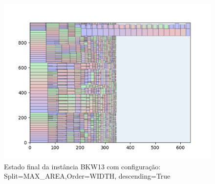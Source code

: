 \begin{figure}[H]
    \centering
    \caption[]{Estado final da instância BKW13 com configuração: Split=MAX_AREA,Order=WIDTH, descending=True}
    \label{fig:bkw13-max_area-width-true}
    \includegraphics[scale=0.5]{output/figures/bkw/bkw13/max_area/width/true/0000}
\end{figure}
